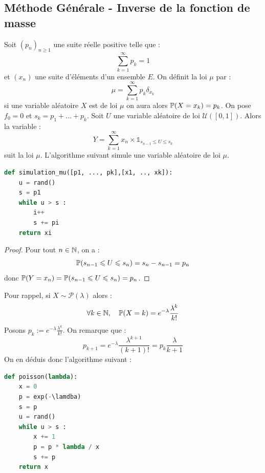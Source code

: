 \subsection{Méthode Générale - Inverse de la fonction de masse}

\begin{proposition}
    Soit $(p_n)_{n \geqslant 1}$ une suite réelle positive telle que : 
        \[ \sum_{k=1}^{\infty} p_k = 1 \] 
    et $(x_n)$ une suite d'éléments d'un ensemble $E$. On définit la loi $ \mu$ par : 
        \[ \mu = \sum_{k=1}^{\infty} p_k \delta_{x_k} \] 
    si une variable aléatoire $X$ est de loi $ \mu$ on aura alors $ \mathbb{P}(X = x_k) = p_k$. 
    On pose $f_0 = 0$ et $s_k = p_1 + \dots + p_k$. Soit $U$ une variable aléatoire de loi $ \mathcal{U}([0,1])$. 
    Alors la variable : 
        \[ Y = \sum_{k=1}^{\infty} x_n \times \mathds{1}_{s_{n-1} \leqslant U \leqslant s_k} \] 
    suit la loi $ \mu$. L'algorithme suivant simule une variable aléatoire de loi $ \mu$. 
    \begin{lstlisting}[language=Python]
def simulation_mu([p1, ..., pk],[x1, .., xk]): 
    u = rand() 
    s = p1 
    while u > s :
        i++ 
        s += pi 
    return xi 
    \end{lstlisting}  
\end{proposition}

\begin{proof}
    Pour tout $n \in \mathbb{N}$, on a :
        \[ \mathbb{P}(s_{n-1} \leqslant U \leqslant s_n) = s_n - s_{n-1} = p_n \] 
    donc $ \mathbb{P}(Y = x_n) = \mathbb{P}(s_{n-1} \leqslant U \leqslant s_n) = p_n $.   
\end{proof}

\begin{example}
    Pour rappel, si $X \sim \mathcal{P}(\lambda)$ alors : 
        \[ \forall k \in \mathbb{N}, \quad \mathbb{P}(X = k) = e^{-\lambda} \frac{\lambda^k}{k !} \]  
    Posons $ p_k := e^{- \lambda} \frac{ \lambda^k}{k!}$. On remarque que : 
        \[ p_{k+1} = e^{- \lambda} \frac{ \lambda^{k+1}}{(k+1)!} = p_k \frac{ \lambda}{k+1} \] 
    On en déduis donc l'algorithme suivant : 

    \begin{lstlisting}[language=Python]
def poisson(lambda): 
    x = 0 
    p = exp(-\lamdba) 
    s = p 
    u = rand() 
    while u > s : 
        x += 1
        p = p * lambda / x 
        s += p 
    return x  
    \end{lstlisting}
\end{example}

